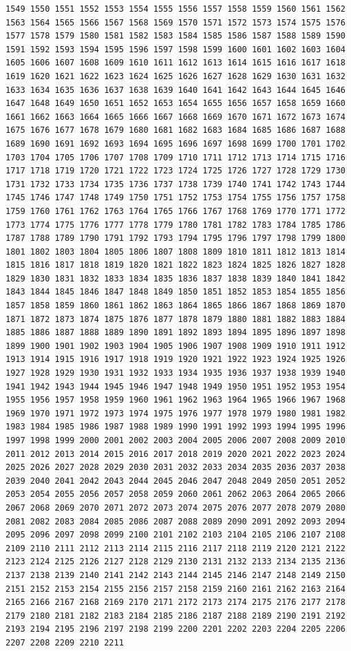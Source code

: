 \documentclass[11pt,]{article}
\begin{document}
\begin{verbatim}
1549 1550 1551 1552 1553 1554 1555 1556 1557 1558 1559 1560 1561 1562 1563 1564 1565 1566 1567 1568 1569 1570 1571 1572 1573 1574 1575 1576 1577 1578 1579 1580 1581 1582 1583 1584 1585 1586 1587 1588 1589 1590 1591 1592 1593 1594 1595 1596 1597 1598 1599 1600 1601 1602 1603 1604 1605 1606 1607 1608 1609 1610 1611 1612 1613 1614 1615 1616 1617 1618 1619 1620 1621 1622 1623 1624 1625 1626 1627 1628 1629 1630 1631 1632 1633 1634 1635 1636 1637 1638 1639 1640 1641 1642 1643 1644 1645 1646 1647 1648 1649 1650 1651 1652 1653 1654 1655 1656 1657 1658 1659 1660 1661 1662 1663 1664 1665 1666 1667 1668 1669 1670 1671 1672 1673 1674 1675 1676 1677 1678 1679 1680 1681 1682 1683 1684 1685 1686 1687 1688 1689 1690 1691 1692 1693 1694 1695 1696 1697 1698 1699 1700 1701 1702 1703 1704 1705 1706 1707 1708 1709 1710 1711 1712 1713 1714 1715 1716 1717 1718 1719 1720 1721 1722 1723 1724 1725 1726 1727 1728 1729 1730 1731 1732 1733 1734 1735 1736 1737 1738 1739 1740 1741 1742 1743 1744 1745 1746 1747 1748 1749 1750 1751 1752 1753 1754 1755 1756 1757 1758 1759 1760 1761 1762 1763 1764 1765 1766 1767 1768 1769 1770 1771 1772 1773 1774 1775 1776 1777 1778 1779 1780 1781 1782 1783 1784 1785 1786 1787 1788 1789 1790 1791 1792 1793 1794 1795 1796 1797 1798 1799 1800 1801 1802 1803 1804 1805 1806 1807 1808 1809 1810 1811 1812 1813 1814 1815 1816 1817 1818 1819 1820 1821 1822 1823 1824 1825 1826 1827 1828 1829 1830 1831 1832 1833 1834 1835 1836 1837 1838 1839 1840 1841 1842 1843 1844 1845 1846 1847 1848 1849 1850 1851 1852 1853 1854 1855 1856 1857 1858 1859 1860 1861 1862 1863 1864 1865 1866 1867 1868 1869 1870 1871 1872 1873 1874 1875 1876 1877 1878 1879 1880 1881 1882 1883 1884 1885 1886 1887 1888 1889 1890 1891 1892 1893 1894 1895 1896 1897 1898 1899 1900 1901 1902 1903 1904 1905 1906 1907 1908 1909 1910 1911 1912 1913 1914 1915 1916 1917 1918 1919 1920 1921 1922 1923 1924 1925 1926 1927 1928 1929 1930 1931 1932 1933 1934 1935 1936 1937 1938 1939 1940 1941 1942 1943 1944 1945 1946 1947 1948 1949 1950 1951 1952 1953 1954 1955 1956 1957 1958 1959 1960 1961 1962 1963 1964 1965 1966 1967 1968 1969 1970 1971 1972 1973 1974 1975 1976 1977 1978 1979 1980 1981 1982 1983 1984 1985 1986 1987 1988 1989 1990 1991 1992 1993 1994 1995 1996 1997 1998 1999 2000 2001 2002 2003 2004 2005 2006 2007 2008 2009 2010 2011 2012 2013 2014 2015 2016 2017 2018 2019 2020 2021 2022 2023 2024 2025 2026 2027 2028 2029 2030 2031 2032 2033 2034 2035 2036 2037 2038 2039 2040 2041 2042 2043 2044 2045 2046 2047 2048 2049 2050 2051 2052 2053 2054 2055 2056 2057 2058 2059 2060 2061 2062 2063 2064 2065 2066 2067 2068 2069 2070 2071 2072 2073 2074 2075 2076 2077 2078 2079 2080 2081 2082 2083 2084 2085 2086 2087 2088 2089 2090 2091 2092 2093 2094 2095 2096 2097 2098 2099 2100 2101 2102 2103 2104 2105 2106 2107 2108 2109 2110 2111 2112 2113 2114 2115 2116 2117 2118 2119 2120 2121 2122 2123 2124 2125 2126 2127 2128 2129 2130 2131 2132 2133 2134 2135 2136 2137 2138 2139 2140 2141 2142 2143 2144 2145 2146 2147 2148 2149 2150 2151 2152 2153 2154 2155 2156 2157 2158 2159 2160 2161 2162 2163 2164 2165 2166 2167 2168 2169 2170 2171 2172 2173 2174 2175 2176 2177 2178 2179 2180 2181 2182 2183 2184 2185 2186 2187 2188 2189 2190 2191 2192 2193 2194 2195 2196 2197 2198 2199 2200 2201 2202 2203 2204 2205 2206 2207 2208 2209 2210 2211 
\end{verbatim}
\end{document}
